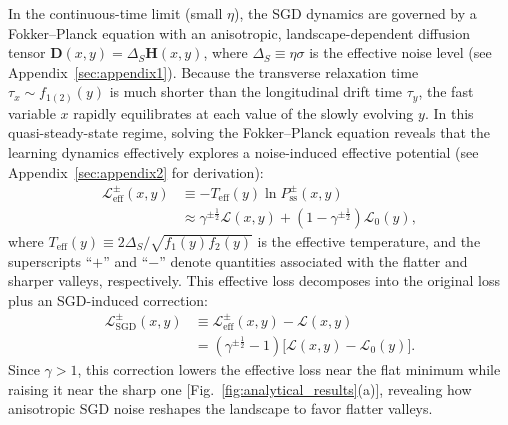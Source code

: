 \documentclass[aps,prx,reprint,superscriptaddress,longbibliography,nofootinbib,floatfix]{revtex4-2}
\begin{document}
In the continuous-time limit (small $\eta$), the SGD dynamics are governed by a Fokker--Planck equation with an anisotropic, landscape-dependent diffusion tensor $\mathbf{D}(x,y) = \Delta_S \mathbf{H}(x,y)$, where $\Delta_S \equiv \eta\sigma$ is the effective noise level (see Appendix~\ref{sec:appendix1}). Because the transverse relaxation time $\tau_x \sim f_{1(2)}(y)$ is much shorter than the longitudinal drift time $\tau_y$, the fast variable $x$ rapidly equilibrates at each value of the slowly evolving $y$. In this quasi-steady-state regime, solving the Fokker--Planck equation reveals that the learning dynamics effectively explores a noise-induced effective potential (see Appendix~\ref{sec:appendix2} for derivation):
\begin{equation}
\begin{split}
    \mathcal{L}_{\mathrm{eff}}^{\pm}(x,y)
    &\equiv -T_{\mathrm{eff}}(y)\ln P_\mathrm{ss}^{\pm}(x,y)  \\
    &\approx
    \gamma^{\pm\frac{1}{2}}\mathcal{L}(x,y)
    +\left(1-\gamma^{\pm\frac{1}{2}}\right)\mathcal{L}_0(y),
\end{split}
\label{eq:effective_loss_SGD}
\end{equation}
where $T_{\mathrm{eff}}(y) \equiv 2\Delta_S / \sqrt{f_1(y)f_2(y)}$ is the effective temperature, and the superscripts ``$+$'' and ``$-$'' denote quantities associated with the flatter and sharper valleys, respectively. This effective loss decomposes into the original loss plus an SGD-induced correction:
\begin{equation}
\begin{split}
    \mathcal{L}_{\mathrm{SGD}}^{\pm}(x,y)
    &\equiv \mathcal{L}_{\mathrm{eff}}^{\pm}(x,y)-\mathcal{L}(x,y) \\
    &= \left(\gamma^{\pm\frac{1}{2}}-1\right)
    \big[\mathcal{L}(x,y)-\mathcal{L}_0(y)\big].
\end{split}
\end{equation}
Since $\gamma > 1$, this correction lowers the effective loss near the flat minimum while raising it near the sharp one [Fig.~\ref{fig:analytical_results}(a)], revealing how anisotropic SGD noise reshapes the landscape to favor flatter valleys.
\end{document}
